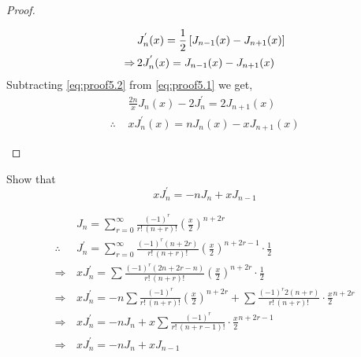 \documentclass[../main-sheet.tex]{subfiles}
\begin{document}
\begin{proof}
\begin{enumerate}[label={(\roman*)}]
\begin{align}
            & J_n^{'}(x)=\frac{1}{2}\left[ J_{n-1}(x)-J_{n+1}(x) \right]\notag\\
            \Rightarrow\, & 2 J_n^{'}(x)=J_{n-1}(x)-J_{n+1}(x)\label{eq:proof5.2}
        \end{align}
        Subtracting \eqref{eq:proof5.2} from \eqref{eq:proof5.1} we get,
        \begin{align*}
            &\frac{2n}{x}J_n(x)-2J_n^{'}=2J_{n+1}(x)\\
            \therefore\,\, & xJ_{n}^{'}(x)=nJ_n(x)-xJ_{n+1}(x)
        \end{align*}
    \end{enumerate}
\end{proof}
\begin{prob}
    Show that 
    \[
        xJ_n^{'}=-nJ_n+xJ_{n-1}
    \]
\end{prob}
\begin{soln}
    \begin{align*}
        & J_n =\sum_{r=0}^{\infty} \frac{(-1)^r}{r!\,(n+r)!} \left( \frac{x}{2} \right)^{n+2r}\\
        \therefore\, &J_n^{'}=\sum_{r=0}^{\infty} \frac{(-1)^r(n+2r)}{r!\,(n+r)!} \left( \frac{x}{2} \right)^{n+2r-1}\cdot\frac{1}{2}\\
        \Rightarrow\, &xJ_n^{'}=\sum\frac{(-1)^r(2n+2r-n)}{r!\,(n+r)!} \left( \frac{x}{2} \right)^{n+2r}\cdot\frac{1}{2}\\
        \Rightarrow\, &xJ_n^{'}=-n \sum\frac{(-1)^r}{r!\,(n+r)!} \left( \frac{x}{2} \right)^{n+2r}+\sum \frac{(-1)^r2(n+r)}{r!\,(n+r)!}\cdot\frac{x}{2}^{n+2r}\\
        \Rightarrow\, &xJ_n^{'}=-n J_n+x\sum \frac{(-1)^r}{r!\,(n+r-1)!}\cdot\frac{x}{2}^{n+2r-1}\\
        \Rightarrow\, &xJ_n^{'}=-n J_n+xJ_{n-1}
    \end{align*}
\end{soln}
\end{document}
